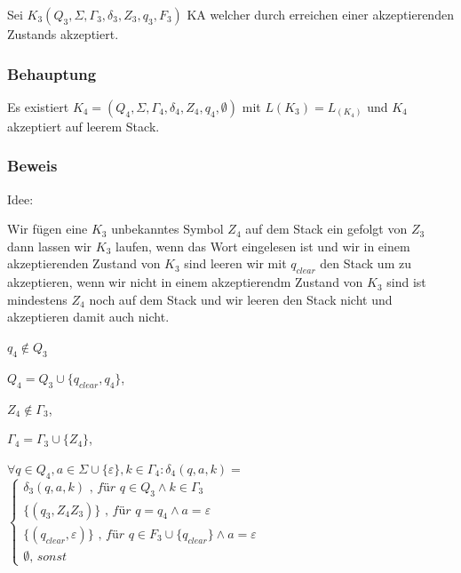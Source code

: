 Sei $K_3 (Q_3,\Sigma, \Gamma_3,\delta_3, Z_3,q_3,F_3)$ KA welcher durch erreichen einer akzeptierenden Zustands akzeptiert.

\subsubsection*{Behauptung}

Es existiert $K_4 = (Q_4,\Sigma,\Gamma_4,\delta_4,Z_4,q_4,\emptyset)$ mit $L(K_3) = L_(K_4)$
und $K_4$ akzeptiert auf leerem Stack.


\subsubsection*{Beweis}

Idee:

Wir fügen eine $K_3$ unbekanntes Symbol $Z_4$ auf dem Stack ein gefolgt von $Z_3$ dann lassen wir $K_3$ laufen,
wenn das Wort eingelesen ist und wir in einem akzeptierenden Zustand von $K_3$ sind leeren wir mit $q_{clear}$ den Stack um zu akzeptieren,
wenn wir nicht in einem akzeptierendm Zustand von $K_3$ sind ist mindestens $Z_4$ noch auf dem Stack und wir leeren den Stack nicht und akzeptieren damit auch nicht.

$q_4 \notin Q_3$

$Q_4 = Q_3 \cup \{ q_{clear},q_4 \}$,

$Z_4 \notin \Gamma_3$,

$\Gamma_4 = \Gamma_3 \cup \{Z_4\}$,

$\forall q \in Q_4 , a \in \Sigma \cup \{\varepsilon\}, k \in \Gamma_4: \delta_4(q,a,k) = $
$\begin{cases}
	\delta_3(q,a,k) \textit{ , für }q \in Q_3 \wedge k \in \Gamma_3 \\
	\{(q_3,Z_4Z_3)\} \textit{ , für } q = q_4 \wedge a = \varepsilon \\
	\{(q_{clear},\varepsilon)\} \textit{ , für } q \in F_3 \cup \{q_{clear}\} \wedge a = \varepsilon \\
	\emptyset \textit{, sonst}
\end{cases}$







